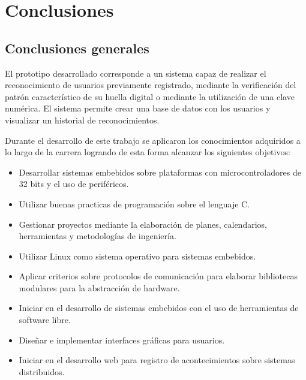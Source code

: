 
\chapter{Conclusiones} %

\label{Chapter5} %




\section{Conclusiones generales }

El prototipo desarrollado corresponde a un sistema capaz de realizar el reconocimiento de usuarios previamente registrado, mediante la verificación del patrón característico de su huella digital o mediante la utilización de una clave numérica. El sistema permite crear una base de datos con los usuarios y visualizar un historial de reconocimientos.

Durante el desarrollo de este trabajo se aplicaron los conocimientos adquiridos a lo largo de la carrera logrando de esta forma alcanzar los siguientes objetivos:

\begin{itemize}
\item Desarrollar sistemas embebidos sobre plataformas con microcontroladores de 32 bits y el uso de periféricos.

\item Utilizar buenas practicas de programación sobre el lenguaje C.

\item Gestionar proyectos mediante la elaboración de planes, calendarios, herramientas y metodologías de ingeniería.

\item Utilizar Linux como sistema operativo para sistemas embebidos.

\item Aplicar criterios sobre protocolos de comunicación para elaborar bibliotecas modulares para la abstracción de hardware.

\item Iniciar en el desarrollo de sistemas embebidos con el uso de herramientas de software libre.

\item Diseñar e implementar interfaces gráficas para usuarios.

\item Iniciar en el desarrollo web para registro de acontecimientos sobre sistemas distribuidos.
\end{itemize}

